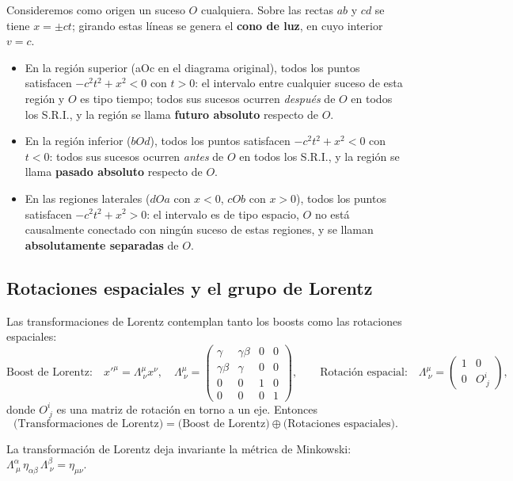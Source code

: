 Consideremos como origen un suceso $O$ cualquiera. Sobre las rectas $ab$
y $cd$ se tiene $x=\pm ct$; girando estas líneas se genera el
\textbf{cono de luz}, en cuyo interior $v=c$.
\begin{itemize}
\item En la región superior (aOc en el diagrama original), todos los
puntos satisfacen $-c^2t^2+x^2<0$ con $t>0$: el intervalo entre
cualquier suceso de esta región y $O$ es tipo tiempo; todos sus sucesos
ocurren \emph{después} de $O$ en todos los S.R.I., y la región se llama
\textbf{futuro absoluto} respecto de $O$.
\item En la región inferior ($bOd$), todos los puntos satisfacen
$-c^2t^2+x^2<0$ con $t<0$: todos sus sucesos ocurren \emph{antes} de
$O$ en todos los S.R.I., y la región se llama \textbf{pasado absoluto}
respecto de $O$.
\item En las regiones laterales ($dOa$ con $x<0$, $cOb$ con $x>0$),
todos los puntos satisfacen $-c^2t^2+x^2>0$: el intervalo es de tipo
espacio, $O$ no está causalmente conectado con ningún suceso de estas
regiones, y se llaman \textbf{absolutamente separadas} de $O$.
\end{itemize}

\subsection{Rotaciones espaciales y el grupo de Lorentz}

Las transformaciones de Lorentz contemplan tanto los boosts como las
rotaciones espaciales:
\[
\text{Boost de Lorentz:}\quad x'^\mu=\Lambda^\mu_{\ \nu}x^\nu, \quad
\Lambda^\mu_{\ \nu} = \begin{pmatrix}\gamma&\gamma\beta&0&0\\
\gamma\beta&\gamma&0&0\\0&0&1&0\\0&0&0&1\end{pmatrix}, \qquad
\text{Rotación espacial:}\quad \Lambda^\mu_{\ \nu} = \begin{pmatrix}
1&0\\0&O^i_{\ j}\end{pmatrix},
\]
donde $O^i_{\ j}$ es una matriz de rotación en torno a un eje. Entonces
\[
\big(\text{Transformaciones de Lorentz}\big) = \big(\text{Boost de
Lorentz}\big) \oplus \big(\text{Rotaciones espaciales}\big).
\]

\begin{proposicionc}
La transformación de Lorentz deja invariante la métrica de Minkowski:
$\Lambda^\alpha_{\ \mu}\,\eta_{\alpha\beta}\,\Lambda^\beta_{\
\nu} = \eta_{\mu\nu}$.
\end{proposicionc}

